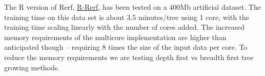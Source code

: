 \documentclass[simplex.tex]{subfiles}
\begin{document}
\clearpage
The R version of Rerf, \href{https://github.com/neurodata/R-RerF}{R-Rerf}, has been tested on a 400Mb artificial dataset.  The training time on this data set is about 3.5 minutes/tree using 1 core, with the training time scaling linearly with the number of cores added.  The increased memory requirements of the multicore implementation are higher than anticipated though -- requiring 8 times the size of the input data per core.  To reduce the memory requirements we are testing depth first vs breadth first tree growing methods.  

\clearpage
\end{document}
